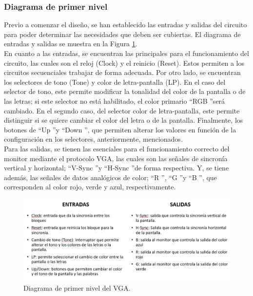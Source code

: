 \documentclass[12pt,a4paper]{article}
\begin{document}
\subsubsection{Diagrama de primer nivel}  \label{sec:VGA_pn}
Previo a comenzar el diseño, se han establecido las entradas y salidas del circuito para poder determinar las necesidades que deben ser cubiertas. El diagrama de entradas y salidas se muestra en la Figura \ref{fig:PrimerNivel}. \\[2ex]
En cuanto a las entradas, se encuentran las principales para el funcionamiento del circuito, las cuales son el reloj (Clock) y el reinicio (Reset). Estos permiten a los circuitos secuenciales trabajar de forma adecuada. Por otro lado, se encuentran los selectores de tono (Tone) y color de letra-pantalla (LP). En el caso del selector de tono, este permite modificar la tonalidad del color de la pantalla o de las letras; si este selector no está habilitado, el color primario \textquotedblleft RGB \textquotedblright será cambiado. En el segundo caso, del selector color de letra-pantalla, este permite distinguir si se quiere cambiar el color del letra o de la pantalla. Finalmente, los botones de \textquotedblleft Up \textquotedblright y \textquotedblleft Down \textquotedblright, que permiten alterar los valores en función de la configuración en los selectores, anteriormente, mencionados. \\[2ex]
Para las salidas, se tienen las esenciales para el funcionamiento correcto del monitor mediante el protocolo VGA, las cuales son las señales de sincronía vertical y horizontal; \textquotedblleft V-Sync \textquotedblright y \textquotedblleft H-Sync \textquotedblright de forma respectiva. Y, se tiene además, las señales de datos analógicos de color; \textquotedblleft R \textquotedblright, \textquotedblleft G \textquotedblright y \textquotedblleft B \textquotedblright, que corresponden al color rojo, verde y azul, respectivamente.

\begin{figure}[htbp]
  \centering
    \includegraphics[width=18cm]{Img/PrimerNivel.png}
  \caption{Diagrama de primer nivel del VGA.}
  \label{fig:PrimerNivel}
\end{figure}
\end{document}
